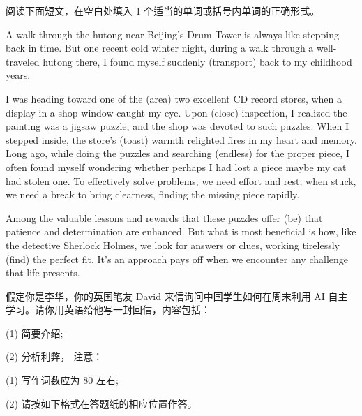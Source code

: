\documentclass{英语试卷}
\begin{document}
\par 阅读下面短文，在空白处填入 1 个适当的单词或括号内单词的正确形式。\par
\par A walk through the hutong near Beijing's Drum Tower is always like stepping back in time. But  one recent cold winter night, during a walk through a well-traveled hutong there, I found myself suddenly (transport) back to my childhood years.\par
\par I was heading toward one of the  (area) two excellent CD record stores, when a display in a shop window caught my eye. Upon  (close) inspection, I realized the painting was a jigsaw puzzle, and the shop was devoted to such puzzles. When I stepped inside, the store's  (toast) warmth relighted fires in my heart and memory. Long ago, while doing the puzzles and searching  (endless) for the proper piece, I often found myself wondering whether perhaps I had lost a piece  maybe my cat had stolen one. To effectively solve problems, we need effort and rest; when stuck, we need a break to bring clearness, finding the missing piece rapidly.\par
\par Among the valuable lessons and rewards that these puzzles offer  (be) that patience and determination are enhanced. But what is most beneficial is how, like the detective Sherlock Holmes, we look for answers or clues, working tirelessly  (find) the perfect fit. It's an approach  pays off when we encounter any challenge that life presents.\par
{}
\par 假定你是李华，你的英国笔友 David 来信询问中国学生如何在周末利用 AI 自主学习。请你用英语给他写一封回信，内容包括：\par
\par (1) 简要介绍;\par
\par (2) 分析利弊， 注意：\par
\par (1) 写作词数应为 80 左右;\par
\par (2) 请按如下格式在答题纸的相应位置作答。\par
\end{document}
